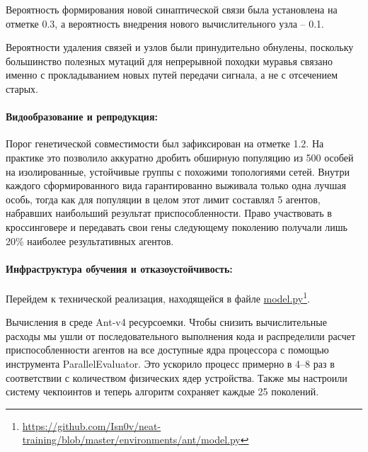 Вероятность формирования новой синаптической связи была установлена на отметке 0.3, а вероятность внедрения нового вычислительного узла -- 0.1.

Вероятности удаления связей и узлов были принудительно обнулены, поскольку большинство полезных мутаций для непрерывной походки муравья связано именно с прокладыванием новых путей передачи сигнала, а не с отсечением старых.

\paragraph{Видообразование и репродукция:}

Порог генетической совместимости был зафиксирован на отметке 1.2. На практике это позволило аккуратно дробить обширную популяцию из 500 особей на изолированные, устойчивые группы с похожими топологиями сетей. Внутри каждого сформированного вида гарантированно выживала только одна лучшая особь, тогда как для популяции в целом этот лимит составлял 5 агентов, набравших наибольший результат приспособленности. Право участвовать в кроссинговере и передавать свои гены следующему поколению получали лишь 20\% наиболее результативных агентов.

\paragraph{Инфраструктура обучения и отказоустойчивость:}

Перейдем к технической реализация, находящейся в файле \href{https://github.com/Isn0v/neat-training/blob/master/environments/ant/model.py}{model.py}\footnote{\url{https://github.com/Isn0v/neat-training/blob/master/environments/ant/model.py}}.

Вычисления в среде Ant-v4 ресурсоемки. Чтобы снизить вычислительные расходы мы ушли от последовательного выполнения кода и распределили расчет приспособленности агентов на все доступные ядра процессора с помощью инструмента ParallelEvaluator. Это ускорило процесс примерно в 4–8 раз в соответствии с количеством физических ядер устройства. Также мы настроили систему чекпоинтов и теперь алгоритм сохраняет каждые 25 поколений.
